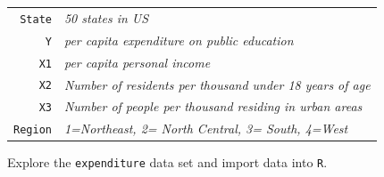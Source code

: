\documentclass[12pt,letterpaper]{article}
\begin{document}
	
	\begin{tabular}{r|l}
		\texttt{State} &\emph{50 states in US} \\
		\texttt{Y} & \emph{per capita expenditure on public education}\\
		\texttt{X1} &\emph{per capita personal income} \\
		\texttt{X2} &  \emph{Number of residents per thousand under 18 years of age}\\
		\texttt{X3} &  \emph{Number of people per thousand residing in urban areas} \\
		\texttt{Region} &  \emph{1=Northeast, 2= North Central, 3= South, 4=West} \\
	\end{tabular}
	
	\vspace{.5cm}
	\noindent Explore the \texttt{expenditure} data set and import data into \texttt{R}.
	\vspace{.5cm}
	  
	\vspace{.5cm}
\end{document}
